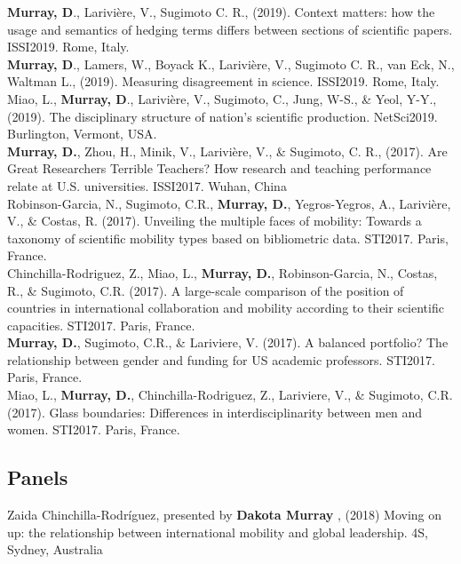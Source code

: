 \documentclass[10pt, a4paper]{article}
\newcommand{\years}[1]{\marginnote{\scriptsize #1}}
\begin{document}
\years{2019} \hangindent=0.7cm \textbf{Murray, D}., Larivière, V., Sugimoto C. R., (2019). Context matters: how the usage and semantics of hedging terms differs between sections of scientific papers. ISSI2019. Rome, Italy.\\

\years{2019} \hangindent=0.7cm  \textbf{Murray, D}., Lamers, W., Boyack K., Larivière, V., Sugimoto C. R., van Eck, N., Waltman L., (2019). Measuring disagreement in science. ISSI2019. Rome, Italy.\\

\years{2019} \hangindent=0.7cm Miao, L., \textbf{Murray, D}., Larivière, V., Sugimoto, C., Jung, W-S., \&  Yeol, Y-Y., (2019). The disciplinary structure of nation's scientific production. NetSci2019. Burlington, Vermont, USA.\\

\years{2017} \hangindent=0.7cm \textbf{Murray, D.}, Zhou, H., Minik, V., Larivière, V., \& Sugimoto, C. R., (2017). Are Great Researchers Terrible Teachers? How research and teaching performance relate at U.S. universities. ISSI2017. Wuhan, China\\

\years{2017} \hangindent=0.7cm Robinson-Garcia, N., Sugimoto, C.R., \textbf{Murray, D.}, Yegros-Yegros, A., Larivière, V., \& Costas, R. (2017). Unveiling the multiple faces of mobility: Towards a taxonomy of scientific mobility types based on bibliometric data. STI2017. Paris, France.\\

\years{2017} \hangindent=0.7cm Chinchilla-Rodriguez, Z., Miao, L., \textbf{Murray, D.}, Robinson-Garcia, N., Costas, R., \& Sugimoto, C.R. (2017). A large-scale comparison of the position of countries in international collaboration and mobility according to their scientific capacities. STI2017. Paris, France.\\

\years{2017} \hangindent=0.7cm \textbf{Murray, D.}, Sugimoto, C.R., \& Lariviere, V. (2017). A balanced portfolio? The relationship between gender and funding for US academic professors. STI2017. Paris, France.\\

\years{2017} \hangindent=0.7cm Miao, L., \textbf{Murray, D.}, Chinchilla-Rodriguez, Z., Lariviere, V., \& Sugimoto, C.R. (2017). Glass boundaries: Differences in interdisciplinarity between men and women. STI2017. Paris, France.

\subsection*{Panels}
\years{2018} \hangindent=0.7cm Zaida Chinchilla-Rodríguez, presented by \textbf{Dakota Murray }, (2018) Moving on up: the relationship between international mobility and global leadership. 4S, Sydney, Australia\\
\end{document}
